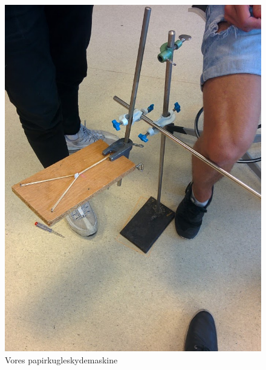 \documentclass[12pt,a4paper]{article}
\theoremstyle{break}
\theoremstyle{nonumberplain}
\begin{document}
\begin{figure}
\center
\includegraphics[scale=0.2]{papirkuglekastemaskine}
\caption{Vores papirkugleskydemaskine}\label{maskine}

\end{figure}
\end{document}
